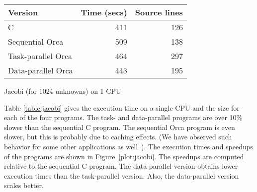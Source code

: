 \documentclass{acmtrans2e}
\begin{document}

\begin{acmtable}{8cm}
\centering
\begin{tabular*}{8cm}{@{\extracolsep\fill}l|r r }
{\bf Version} & {\bf Time (secs)} & {\bf Source lines} \\
\hline
C & 411 & 126 \\
Sequential Orca & 509 & 138 \\
Task-parallel Orca & 464 & 297 \\
Data-parallel Orca & 443 & 195 \\
\end{tabular*}
\caption{Jacobi (for 1024 unknowns) on 1 CPU}
\label{table:jacobi}
\end{acmtable}

Table \ref{table:jacobi} gives the execution time on a single CPU and the size
for each of the four programs.
The task- and data-parallel programs are over 10\% slower than the
sequential C program. The sequential Orca program is even slower, but
this is probably due to caching effects. (We have observed such
behavior for some other applications as well~\cite{Bal:1998}).
The execution times and speedups of the programs are shown in
Figure~\ref{plot:jacobi}.
The speedups are computed relative to the sequential C program.
The data-parallel version obtains lower execution times than the
task-parallel version. Also, the data-parallel version scales better.

\end{document}
